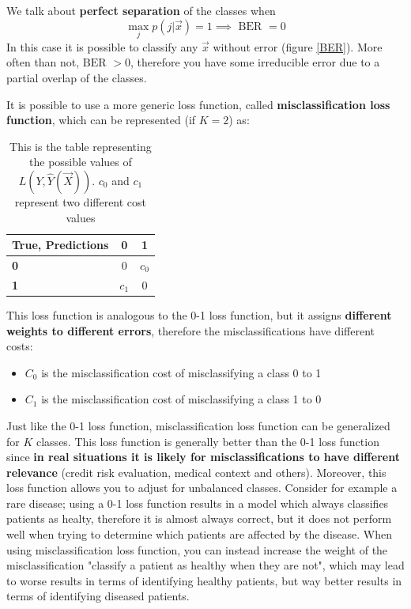     We talk about \textbf{perfect separation } of the classes when 
    $$\max_{j} p(j|\vec{x}) = 1 \implies \text{ BER } = 0$$
    In this case it is possible to classify any $\vec{x}$ without error (figure \ref{BER}). More often than not,
    $\text{BER } > 0$, therefore you have some irreducible error due to a partial overlap of the classes.

    It is possible to use a more generic loss function, called \textbf{misclassification loss function}, which can be represented (if $K = 2$) as:
    
\begin{table}
\centering
\caption{This is the table representing the possible values of $ L(Y, \hat{Y}(\vec{X})) $. $c_0$ and $c_1$ represent two different cost values}
\begin{tabular}{|l||c|c|}
	\hline
	\textbf{True, Predictions} & \textbf{0} & \textbf{1} \\
	\hline
	\hline
	\textbf{0} &  $0$ & $c_0$ \\
	\hline
	\textbf{\textbf{1}} & $c_1$ & $0$\\
	\hline
\end{tabular}
\end{table} 

    This loss function is analogous to the 0-1 loss function, but it assigns \textbf{different weights to different errors}, therefore the misclassifications have different costs:
    \begin{itemize}
      \item $C_0$ is the misclassification cost of misclassifying a class 0 to 1
      \item $C_1$ is the misclassification cost of misclassifying a class 1 to 0
    \end{itemize}
    Just like the 0-1 loss function, misclassification loss function can be generalized for $K$ classes.
    This loss function is generally better than the 0-1 loss function since\textbf{ in real situations it is likely for misclassifications to have different relevance} (credit risk evaluation, medical context and others). Moreover, this loss function allows you to adjust for unbalanced classes. Consider for example a rare disease; using a 0-1 loss function results in a model which always classifies patients as healty, therefore it is almost always correct, but it does not perform well when trying to determine which patients are affected by the disease. When using misclassification loss function, you can instead increase the weight of the misclassification "classify a patient as healthy when they are not", which may lead to worse results in terms of identifying healthy patients, but way better results in terms of identifying diseased patients.
    
